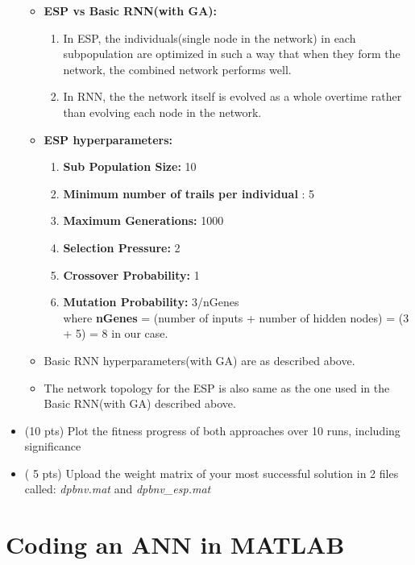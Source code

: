 \documentclass{article}
\begin{document}
\begin{itemize}
\begin{itemize}
\begin{itemize}
\begin{enumerate}
	\end{enumerate}
	\end{itemize}
	\item \textbf{ESP vs Basic RNN(with GA):}
	\begin{enumerate}
	\item In ESP, the individuals(single node in the network) in each subpopulation are optimized in such a way that when they form the network, the combined network performs well.
	\item In RNN, the the network itself is evolved as a whole overtime rather than evolving each node in the network.
	\end{enumerate}
	\item \textbf{ESP hyperparameters:}
	\begin{enumerate}
	\item \textbf{Sub Population Size:} 10
	\item \textbf{Minimum number of trails per individual} : 5
	\item \textbf{Maximum Generations:} 1000
	\item \textbf{Selection Pressure:} 2
	\item \textbf{Crossover Probability:} 1
	\item \textbf{Mutation Probability:} 3/nGenes\\
	where \textbf{nGenes} = (number of inputs + number of hidden nodes) = (3 + 5) = 8 in our case.
 	\end{enumerate}
 	\item Basic RNN hyperparameters(with GA) are as described above.
 	\item The network topology for the ESP is also same as the one used in the Basic RNN(with GA) described above.
	\end{itemize}
	\color{black}
	\item (10 pts) Plot the fitness progress of both approaches over 10 runs, including significance
	\item ( 5 pts) Upload the weight matrix of your most successful solution in 2 files called: \textit{dpbnv.mat} and \textit{dpbnv\_esp.mat}
\end{itemize}
\newpage
\section{Coding an ANN in MATLAB}
\end{document}
